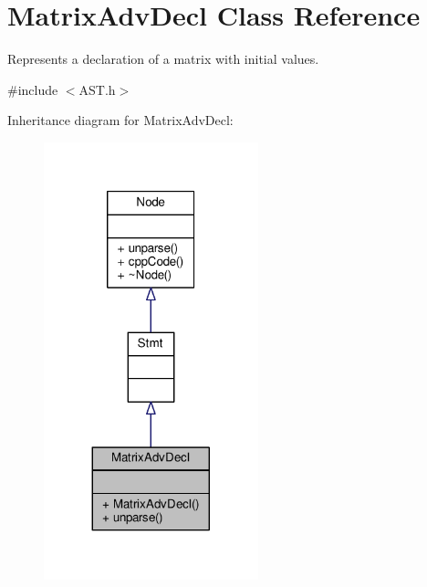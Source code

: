 \hypertarget{classMatrixAdvDecl}{\section{Matrix\-Adv\-Decl Class Reference}
\label{classMatrixAdvDecl}
}


Represents a declaration of a matrix with initial values. \par
  




{\ttfamily \#include $<$A\-S\-T.\-h$>$}



Inheritance diagram for Matrix\-Adv\-Decl\-:\nopagebreak
\begin{figure}[H]
\begin{center}
\leavevmode
\includegraphics[width=176pt]{classMatrixAdvDecl__inherit__graph}
\end{center}
\end{figure}


